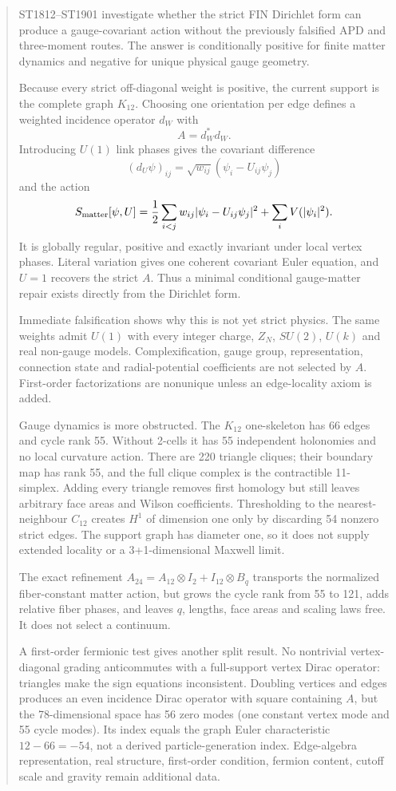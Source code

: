 \documentclass[11pt,a4paper]{article}
\begin{document}
\begin{abstract}
ST1812--ST1901 investigate whether the strict FIN Dirichlet form can produce a
gauge-covariant action without the previously falsified APD and three-moment
routes.  The answer is conditionally positive for finite matter dynamics and
negative for unique physical gauge geometry.

Because every strict off-diagonal weight is positive, the current support is
the complete graph $K_{12}$.  Choosing one orientation per edge defines a
weighted incidence operator $d_W$ with
\[
A=d_W^*d_W.
\]
Introducing $U(1)$ link phases gives the covariant difference
\[
(d_U\psi)_{ij}=\sqrt{w_{ij}}(\psi_i-U_{ij}\psi_j)
\]
and the action
\[
S_{\rm matter}[\psi,U]
=\frac12\sum_{i<j}w_{ij}|\psi_i-U_{ij}\psi_j|^2
+\sum_iV(|\psi_i|^2).
\]
It is globally regular, positive and exactly invariant under local vertex
phases.  Literal variation gives one coherent covariant Euler equation, and
$U=1$ recovers the strict $A$.  Thus a minimal conditional gauge-matter repair
exists directly from the Dirichlet form.

Immediate falsification shows why this is not yet strict physics.  The same
weights admit $U(1)$ with every integer charge, $Z_N$, $SU(2)$, $U(k)$ and real
non-gauge models.  Complexification, gauge group, representation, connection
state and radial-potential coefficients are not selected by $A$.  First-order
factorizations are nonunique unless an edge-locality axiom is added.

Gauge dynamics is more obstructed.  The $K_{12}$ one-skeleton has 66 edges and
cycle rank 55.  Without 2-cells it has 55 independent holonomies and no local
curvature action.  There are 220 triangle cliques; their boundary map has rank
55, and the full clique complex is the contractible 11-simplex.  Adding every
triangle removes first homology but still leaves arbitrary face areas and
Wilson coefficients.  Thresholding to the nearest-neighbour $C_{12}$ creates
$H^1$ of dimension one only by discarding 54 nonzero strict edges.  The
support graph has diameter one, so it does not supply extended locality or a
3+1-dimensional Maxwell limit.

The exact refinement
$A_{24}=A_{12}\otimes I_2+I_{12}\otimes B_q$ transports the normalized
fiber-constant matter action, but grows the cycle rank from 55 to 121, adds
relative fiber phases, and leaves $q$, lengths, face areas and scaling laws
free.  It does not select a continuum.

A first-order fermionic test gives another split result.  No nontrivial
vertex-diagonal grading anticommutes with a full-support vertex Dirac operator:
triangles make the sign equations inconsistent.  Doubling vertices and edges
produces an even incidence Dirac operator with square containing $A$, but the
78-dimensional space has 56 zero modes (one constant vertex mode and 55 cycle
modes).  Its index equals the graph Euler characteristic $12-66=-54$, not a
derived particle-generation index.  Edge-algebra representation, real
structure, first-order condition, fermion content, cutoff scale and gravity
remain additional data.


\end{abstract}
\end{document}
